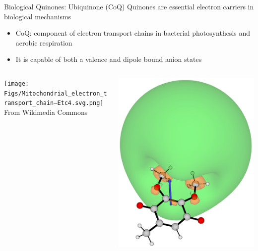 \documentclass[9pt,t,xcolor=table]{beamer}
\begin{document}
\begin{frame}{\huge Biological Quinones: Ubiquinone (CoQ)}\large
	Quinones are essential electron carriers in biological mechanisms
		\vspace{5pt}
		\begin{itemize}
		\item CoQ: component of electron transport chains in bacterial photosynthesis and aerobic respiration	
		\item It is capable of both a valence and dipole bound anion states
		\end{itemize}
		\begin{columns}[b]
			\begin{column}[b]{0.5\textwidth}
				\centering
				\texttt{[image: Figs/Mitochondrial\_electron\_transport\_chain—Etc4.svg.png]}\\
				\vspace{3pt}
				\small From Wikimedia Commons
			\end{column}
			\begin{column}[b]{0.25\textwidth}
				\centering
				\includegraphics[width=\textwidth]{Figs/Q0_181.png}\\

\end{column}
\end{columns}
\end{frame}
\end{document}
